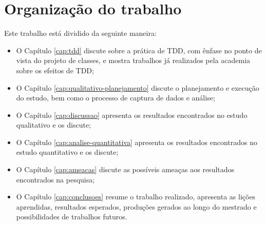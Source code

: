 \section{Organização do trabalho}

Este trabalho está dividido da seguinte maneira: 

\begin{itemize}
	\item O Capítulo \ref{cap:tdd} discute sobre a prática de TDD, com ênfase no
	ponto de vista do projeto de classes, e mostra trabalhos já
	realizados pela academia sobre os efeitos de TDD;

	\item O Capítulo \ref{cap:qualitativo-planejamento} discute o planejamento e execução do estudo,
	bem como o processo de captura de dados e análise;

	\item O Capítulo \ref{cap:discussao} apresenta os resultados encontrados no estudo qualitativo 
	e os discute;
	
	\item O Capítulo \ref{cap:analise-quantitativa} apresenta os resultados encontrados no 
	estudo quantitativo e os discute;	
	
	\item O Capítulo \ref{cap:ameacas} discute as possíveis ameaças aos resultados
	encontrados na pesquisa;
	
	\item O Capítulo \ref{cap:conclusoes} resume o trabalho realizado, apresenta
	as lições aprendidas, resultados esperados, produções gerados ao longo do mestrado 
	e possibilidades de trabalhos futuros.
\end{itemize}

